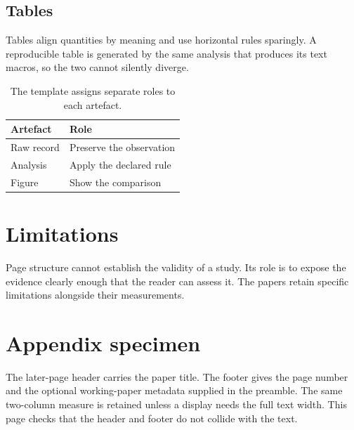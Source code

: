 \documentclass{hyperprior}
\begin{document}
\subsection{Tables}
Tables align quantities by meaning and use horizontal rules sparingly. A
reproducible table is generated by the same analysis that produces its text
macros, so the two cannot silently diverge.
\begin{table}[ht]
\caption{The template assigns separate roles to each artefact.}
\centering
\begin{tabularx}{\linewidth}{lX}
\toprule
Artefact & Role \\
\midrule
Raw record & Preserve the observation \\
Analysis & Apply the declared rule \\
Figure & Show the comparison \\
\bottomrule
\end{tabularx}
\end{table}
\section{Limitations}
Page structure cannot establish the validity of a study. Its role is to expose
the evidence clearly enough that the reader can assess it. The papers retain
specific limitations alongside their measurements.
\clearpage
\section{Appendix specimen}
The later-page header carries the paper title. The footer gives the page number
and the optional working-paper metadata supplied in the preamble.
The same two-column measure is retained unless a display needs the full text
width. This page checks that the header and footer do not collide with the text.
\end{document}
